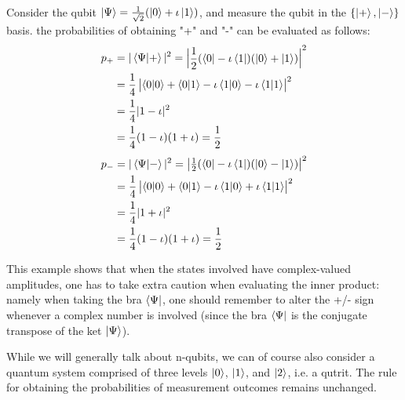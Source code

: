 \begin{example}
    Consider the qubit $\ket{\Psi}=\frac{1}{\sqrt{2}}(\ket{0}+\iota\ket{1})$, and measure the qubit in the $\{\ket{+},\ket{-}\}$ basis. the probabilities of obtaining "+" and "-" can be evaluated as follows:
    \begin{align*}
    p_+&=|\braket{\Psi|+}|^2=\begin{vmatrix} \dfrac{1}{2}(\bra{0}-\iota \bra{1})(\ket{0}+\ket{1})\end{vmatrix}^2\\
    &=\frac{1}{4}\begin{vmatrix} \braket{0|0}+\braket{0|1} - \iota\braket{1|0} - \iota \braket{1|1} \end{vmatrix}^2\\
    &=\frac{1}{4}|1-\iota|^2\\
    &=\frac{1}{4}(1-\iota)(1+\iota)=\frac{1}{2}
    \end{align*}
    \begin{align*}
    p_-&=|\braket{\Psi|-}|^2=\begin{vmatrix} \frac{1}{2}(\bra{0}-\iota \bra{1})(\ket{0}-\ket{1})\end{vmatrix}^2\\
    &=\frac{1}{4}\begin{vmatrix} \braket{0|0}+\braket{0|1} - \iota\braket{1|0} + \iota \braket{1|1} \end{vmatrix}^2\\
    &=\frac{1}{4}|1+\iota|^2\\
    &=\frac{1}{4}(1-\iota)(1+\iota)=\frac{1}{2}
    \end{align*}
\end{example}
This example shows that when the states involved have complex-valued amplitudes, one has to
take extra caution when evaluating the inner product: namely when taking the bra $\bra{\Psi}$, one should remember to alter the +/- sign whenever a complex number is involved (since the bra $\bra{\Psi}$ is the
conjugate transpose of the ket $\ket{\Psi}$). 

While we will generally talk about n-qubits, we can of course also consider a quantum system
comprised of three levels $\ket{0}$, $\ket{1}$, and $\ket{2}$, i.e. a qutrit. The rule for obtaining the probabilities of
measurement outcomes remains unchanged.

